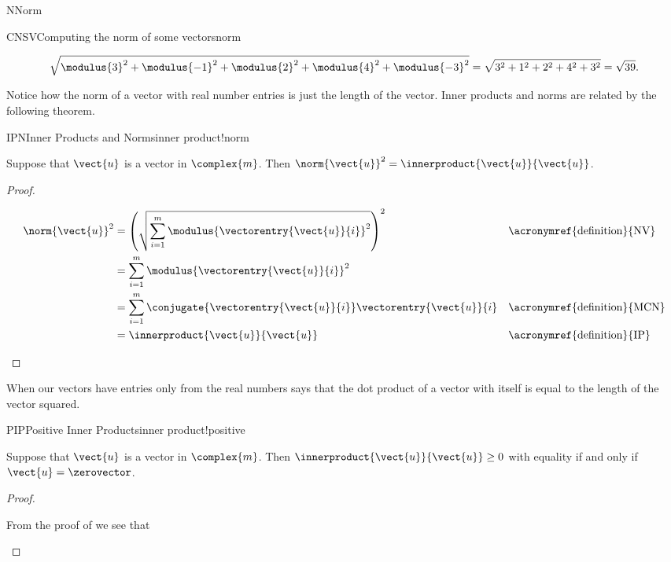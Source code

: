\begin{subsect}{N}{Norm}
\begin{example}{CNSV}{Computing the norm of some vectors}{norm}
\begin{para}
\begin{equation*}
\sqrt{\modulus{3}^2+\modulus{-1}^2+\modulus{2}^2+\modulus{4}^2+\modulus{-3}^2}
=\sqrt{3^2+1^2+2^2+4^2+3^2}=\sqrt{39}.
\end{equation*}
\end{para}
%
\end{example}
%
\begin{para}Notice how the norm of a vector with real number entries is just the length of the vector.  Inner products and norms are related by the following theorem.\end{para}
%
\begin{theorem}{IPN}{Inner Products and Norms}{inner product!norm}
\begin{para}Suppose that $\vect{u}$ is a vector in $\complex{m}$.  Then
$\norm{\vect{u}}^2=\innerproduct{\vect{u}}{\vect{u}}$.
\end{para}
\end{theorem}
%
\begin{proof}
\begin{para}
\begin{align*}
\norm{\vect{u}}^2
&=\left(\sqrt{\sum_{i=1}^{m}\modulus{\vectorentry{\vect{u}}{i}}^2}\right)^2
&&\text{\acronymref{definition}{NV}}\\
%
&=\sum_{i=1}^{m}\modulus{\vectorentry{\vect{u}}{i}}^2\\
%
&=\sum_{i=1}^{m}\conjugate{\vectorentry{\vect{u}}{i}}\vectorentry{\vect{u}}{i}
&&\text{\acronymref{definition}{MCN}}\\
%
&=\innerproduct{\vect{u}}{\vect{u}}
&&\text{\acronymref{definition}{IP}}
%
\end{align*}
\end{para}
\end{proof}
%
\begin{para}When our vectors have entries only from the real numbers  says that the dot product of a vector with itself is equal to the length of the vector squared.\end{para}
%
\begin{theorem}{PIP}{Positive Inner Products}{inner product!positive}
\begin{para}Suppose that $\vect{u}$ is a vector in $\complex{m}$.  Then
$\innerproduct{\vect{u}}{\vect{u}}\geq 0$ with equality if and only if $\vect{u}=\zerovector$.\end{para}
\end{theorem}
%
\begin{proof}
\begin{para}From the proof of   we see that

\end{para}
\end{proof}
\end{subsect}
